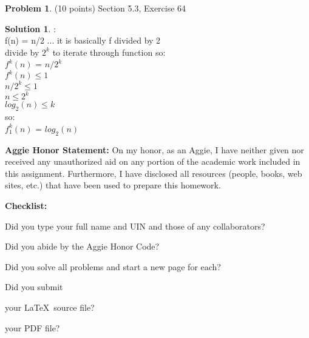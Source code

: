 \documentclass{article}
\theoremstyle{definition}
\newtheorem{problem}{Problem}
\newtheorem*{solution}{Solution}
\newcommand{\honor}{\noindent \textbf{Aggie Honor Statement: }On my honor, as an Aggie, I have neither
  given nor received any unauthorized aid on any portion of the
  academic work included in this assignment. Furthermore, I have
  disclosed all resources (people, books, web sites, etc.) that have
  been used to prepare this homework. 
}
\newcommand{\checklist}{\noindent\textbf{Checklist:}
\begin{compactenum}
\item Did you type your full name and UIN and those of any collaborators? 
\item Did you abide by the Aggie Honor Code?
\item Did you solve all problems and start a new page for each? 
\item Did you submit
\begin{compactenum}
\item your \LaTeX\ source file?
\item your  PDF file?
\end{compactenum}
\end{compactenum}
}
\begin{document}
\newpage

\begin{problem} (10 points) Section 5.3, Exercise 64
\end{problem}
\begin{solution}:
\\
f(n) = n/2 ... it is basically f divided by 2
\\
divide by $2^k$ to iterate through function so:
\\
$f^k (n)$ = $n/2^k$
\\
$f^k (n) \leq 1 $
\\
$n/2^k \leq 1$
\\
$n \leq 2^k$
\\
$log_2 (n) \leq k$
\\
so:
\\
$f_1^k (n) $ = $log_2 (n)$
\end{solution}


\goodbreak
\noindent




\goodbreak
\honor

\bigskip
\checklist
\end{document}
